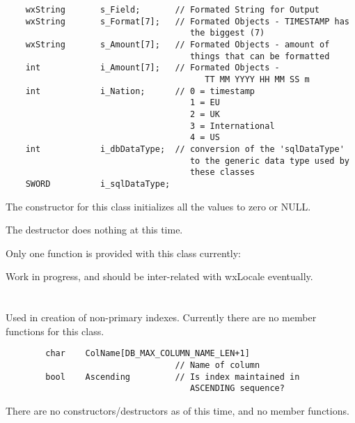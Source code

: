 \begin{verbatim}
    wxString       s_Field;       // Formated String for Output
    wxString       s_Format[7];   // Formated Objects - TIMESTAMP has 
                                     the biggest (7)
    wxString       s_Amount[7];   // Formated Objects - amount of 
                                     things that can be formatted
    int            i_Amount[7];   // Formated Objects - 
                                        TT MM YYYY HH MM SS m
    int            i_Nation;      // 0 = timestamp
                                     1 = EU
                                     2 = UK
                                     3 = International
                                     4 = US
    int            i_dbDataType;  // conversion of the 'sqlDataType'
                                     to the generic data type used by
                                     these classes
    SWORD          i_sqlDataType;
\end{verbatim}

The constructor for this class initializes all the values to zero or NULL.

The destructor does nothing at this time.

Only one function is provided with this class currently:

\label{wxdbcolforformat}

\label{wxdbcolforformat}

Work in progress, and should be inter-related with wxLocale eventually.


\section{}\label{wxdbidxdef}

Used in creation of non-primary indexes.  Currently there are no member 
functions for this class.

\begin{verbatim}
        char    ColName[DB_MAX_COLUMN_NAME_LEN+1] 
                                  // Name of column
        bool    Ascending         // Is index maintained in 
                                     ASCENDING sequence?
\end{verbatim}

There are no constructors/destructors as of this time, and no member functions.


